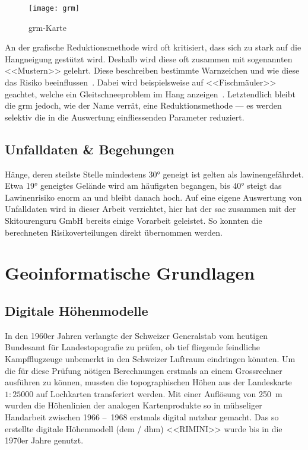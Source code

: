 \begin{figure}[H]
  \centering
  \texttt{[image: grm]}
  \caption{\gls{grm}-Karte~\cite{achtunglawine}}\label{fig:grm}
\end{figure}

An der grafische Reduktionsmethode wird oft kritisiert, dass sich zu stark auf die Hangneigung gestützt wird. Deshalb wird diese oft zusammen mit sogenannten <<Mustern>> gelehrt. Diese beschreiben bestimmte Warnzeichen und wie diese das Risiko beeinflussen~\cite{achtunglawine}. Dabei wird beispielsweise auf <<Fischmäuler>> geachtet, welche ein Gleitschneeproblem im Hang anzeigen~\cite{harveyrhynerschweizerlawinenkunde}. Letztendlich bleibt die \gls{grm} jedoch, wie der Name verrät, eine Reduktionsmethode --- es werden selektiv die in die Auswertung einfliessenden Parameter reduziert.

\subsection{Unfalldaten \& Begehungen}

Hänge, deren steilste Stelle mindestens 30° geneigt ist gelten als lawinengefährdet. Etwa 19° geneigtes Gelände wird am häufigsten begangen, bis 40° steigt das Lawinenrisiko enorm an und bleibt danach hoch. Auf eine eigene Auswertung von Unfalldaten wird in dieser Arbeit verzichtet, hier hat der \acrfull{sac} zusammen mit der Skitourenguru GmbH bereits einige Vorarbeit geleistet. So konnten die berechneten Risikoverteilungen direkt übernommen werden.~\cite{sacbergspwinterp99} 


\clearpage
\section{Geoinformatische Grundlagen}

\subsection{Digitale Höhenmodelle}\label{sec:dem}

In den 1960er Jahren verlangte der Schweizer Generalstab vom heutigen Bundesamt für Landestopografie zu prüfen, ob tief fliegende feindliche Kampfflugzeuge unbemerkt in den Schweizer Luftraum eindringen könnten. Um die für diese Prüfung nötigen Berechnungen erstmals an einem Grossrechner ausführen zu können, mussten die topographischen Höhen aus der Landeskarte $1:25000$ auf Lochkarten transferiert werden. Mit einer Auflösung von \qty{250}{m} wurden die Höhenlinien der analogen Kartenprodukte so in mühseliger Handarbeit zwischen 1966 --~1968 erstmals digital nutzbar gemacht. Das so erstellte digitale Höhenmodell (\acrshort{dem} / \acrshort{dhm}) <<RIMINI>> wurde bis in die 1970er Jahre genutzt.~\cite{swisstopohistdem}

